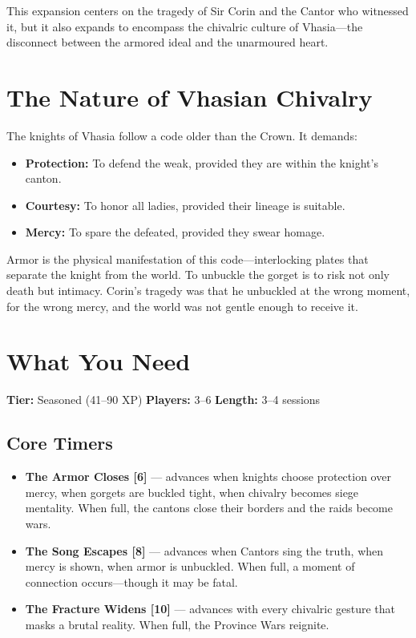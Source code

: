 \documentclass[11pt,twoside]{book}
\begin{document}
This expansion centers on the tragedy of Sir Corin and the Cantor who witnessed it, but it also expands to encompass the chivalric culture of Vhasia---the disconnect between the armored ideal and the unarmoured heart.

\section{The Nature of Vhasian Chivalry}

The knights of Vhasia follow a code older than the Crown.  It demands:

\begin{itemize}
  \item \textbf{Protection:} To defend the weak, provided they are within the knight's canton.
  \item \textbf{Courtesy:} To honor all ladies, provided their lineage is suitable.
  \item \textbf{Mercy:} To spare the defeated, provided they swear homage.
\end{itemize}

Armor is the physical manifestation of this code---interlocking plates that separate the knight from the world.  To unbuckle the gorget is to risk not only death but intimacy.  Corin's tragedy was that he unbuckled at the wrong moment, for the wrong mercy, and the world was not gentle enough to receive it.

\section{What You Need}
\textbf{Tier:} Seasoned (41--90 XP) \quad \textbf{Players:} 3--6 \quad \textbf{Length:} 3--4 sessions

\subsection{Core Timers}
\begin{itemize}
  \item \textbf{The Armor Closes [6]} --- advances when knights choose protection over mercy, when gorgets are buckled tight, when chivalry becomes siege mentality.  When full, the cantons close their borders and the raids become wars.
  \item \textbf{The Song Escapes [8]} --- advances when Cantors sing the truth, when mercy is shown, when armor is unbuckled.  When full, a moment of connection occurs---though it may be fatal.
  \item \textbf{The Fracture Widens [10]} --- advances with every chivalric gesture that masks a brutal reality.  When full, the Province Wars reignite.
\end{itemize}
\end{document}
